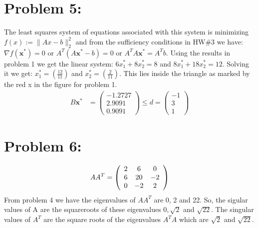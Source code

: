 \documentclass[12pt]{report}
\begin{document}
\section*{Problem 5:}
The least squares system of equations associated with this system is minimizing
$f(x):=\|Ax-b\|_2^2$ and from the sufficiency conditions in HW\#3 we have:
$\nabla f(\textbf{x}^*)=0$ or $A^T(A\textbf{x}^*-b)=0$ or $A^TA\textbf{x}^*=A^Tb$.
Using the results in problem 1 we get the linear system: $6x_1^*+8x_2^*=8$ and $8x_1^*+18x_2^*=12$.
Solving it we get: $x_1^*=(\frac{12}{11})$ and $x_2^*=(\frac{2}{11})$. This lies inside the
triangle as marked by the red x in the figure for problem 1.
\begin{align*}
B\textbf{x}^* &= \left(\begin{array}{c}
-1.2727 \\
2.9091 \\
0.9091
\end{array} \right)\leq
d = \left(\begin{array}{c}
-1\\
3\\
1
\end{array} \right)
\end{align*}

\section*{Problem 6:}
\begin{align*}
AA^T=\left(\begin{array}{c c c}
2  &   6  &   0 \\
6  &  20  &  -2 \\
0  &  -2  &   2
\end{array}\right)
\end{align*}
From problem 4 we have the eigenvalues of $AA^T$ are 0, 2 and 22. So, the sigular values of A are 
the squareroots of these eigenvalues $0,\sqrt{2}$ and $\sqrt{22}$. The singular values of $A^T$ are
the square roots of the eigenvalues $A^TA$ which are $\sqrt{2}$ and $\sqrt{22}$.
\end{document}
